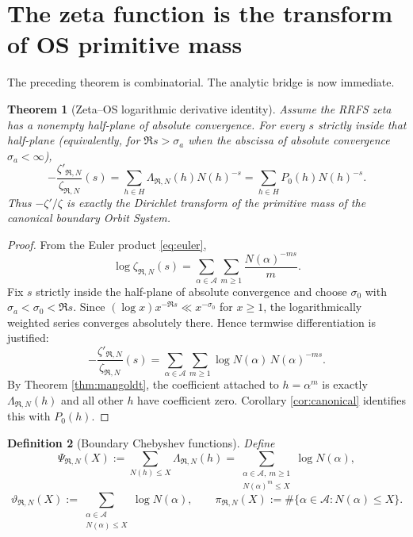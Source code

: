 \documentclass[11pt]{article}
\newtheorem{theorem}{Theorem}[section]
\newtheorem{definition}[theorem]{Definition}
\newcommand{\cA}{\mathcal A}
\newcommand{\cR}{\mathfrak R}
\begin{document}
\section{The zeta function is the transform of OS primitive mass}

The preceding theorem is combinatorial. The analytic bridge is now immediate.

\begin{theorem}[Zeta--OS logarithmic derivative identity]\label{thm:zetaos}
Assume the RRFS zeta has a nonempty half-plane of absolute convergence. For every $s$ strictly inside that half-plane (equivalently, for $\Re s>\sigma_a$ when the abscissa of absolute convergence $\sigma_a<\infty$),
\begin{equation}\label{eq:logder}
\boxed{
-\frac{\zeta'_{\cR,N}}{\zeta_{\cR,N}}(s)
=\sum_{h\in H}\Lambda_{\cR,N}(h)N(h)^{-s}
=\sum_{h\in H}P_0(h)N(h)^{-s}.}
\end{equation}
Thus $-\zeta'/\zeta$ is exactly the Dirichlet transform of the primitive mass of the canonical boundary Orbit System.
\end{theorem}

\begin{proof}
From the Euler product \eqref{eq:euler},
\[
\log\zeta_{\cR,N}(s)
=\sum_{\alpha\in\cA}\sum_{m\ge1}
\frac{N(\alpha)^{-ms}}{m}.
\]
Fix $s$ strictly inside the half-plane of absolute convergence and choose $\sigma_0$ with $\sigma_a<\sigma_0<\Re s$. Since $(\log x)x^{-\Re s}\ll x^{-\sigma_0}$ for $x\ge1$, the logarithmically weighted series converges absolutely there. Hence termwise differentiation is justified:
\[
-\frac{\zeta'_{\cR,N}}{\zeta_{\cR,N}}(s)
=\sum_{\alpha\in\cA}\sum_{m\ge1}
\log N(\alpha)\,N(\alpha)^{-ms}.
\]
By Theorem \ref{thm:mangoldt}, the coefficient attached to $h=\alpha^m$ is exactly $\Lambda_{\cR,N}(h)$ and all other $h$ have coefficient zero. Corollary \ref{cor:canonical} identifies this with $P_0(h)$.
\end{proof}

\begin{definition}[Boundary Chebyshev functions]
Define
\[
\Psi_{\cR,N}(X)
:=\sum_{N(h)\le X}\Lambda_{\cR,N}(h)
=\sum_{\substack{\alpha\in\cA,\ m\ge1\\N(\alpha)^m\le X}}
\log N(\alpha),
\]
\[
\vartheta_{\cR,N}(X)
:=\sum_{\substack{\alpha\in\cA\\N(\alpha)\le X}}
\log N(\alpha),
\qquad
\pi_{\cR,N}(X)
:=\#\{\alpha\in\cA:N(\alpha)\le X\}.
\]
\end{definition}
\end{document}
